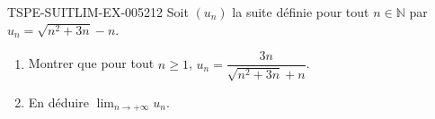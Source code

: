 \begin{exercice}{TSPE-SUITLIM-EX-005}{2}{12}
Soit $(u_n)$ la suite définie pour tout $n \in \mathbb{N}$ par $u_n = \sqrt{n^2 + 3n} - n$.
\begin{enumerate}
  \item Montrer que pour tout $n \geq 1$, $u_n = \dfrac{3n}{\sqrt{n^2 + 3n} + n}$.
  \item En déduire $\lim_{n \to +\infty} u_n$.
\end{enumerate}
\end{exercice}
